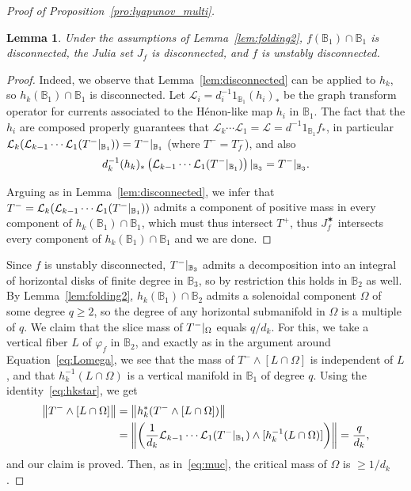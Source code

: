\documentclass[oneside, 12pt]{amsart}
\newcommand{\norm}[1]{{\left\Vert#1\right\Vert}}
\newcommand{\rest}[1]{ \arrowvert_{#1}}
\newcommand{\unsur}[1]{\frac{1}{#1}}
\newcommand{\el}{\mathcal{L}}
\newcommand{\lrpar}[1]{\left(#1\right)}
\newcommand{\inv}{^{-1}}
\newcommand{\bb}{\mathbb{B}}
\theoremstyle{plain}
\newtheorem{lem}[thm]{Lemma}
\theoremstyle{definition}
\numberwithin{equation}{section}       %
\numberwithin{equation}{section}       %
\begin{document}
\begin{proof}[Proof of Proposition~\ref{pro:lyapunov_multi}]
\begin{lem} Under the assumptions of Lemma~\ref{lem:folding2}, 
$f(\bb_1)\cap \bb_1$ is disconnected, 
the Julia set $J_f$ is disconnected, 
and $f$ is unstably disconnected. 
\end{lem}



\begin{proof}
Indeed, we observe that Lemma~\ref{lem:disconnected} can be  applied to  $h_k$, so 
$h_k(\bb_1)\cap \bb_1$ is disconnected. Let 
$\el_i = d_i\inv 1_{\bb_1}(h_i)_*$ be the graph transform operator for currents 
associated to the Hénon-like map $h_i$ in $\bb_1$. 
The fact that  the $h_i$ are composed properly guarantees that 
$\el_k\cdots \el_1  = \el =  d\inv 1_{\bb_1} f_*$, in particular 
$\el_k(\el_{k-1}\cdots \el_1 (T^-\rest{\bb_1})) = T^-\rest{\bb_1}$ (where $T^- = T^-_f$), and also 
 \begin{equation}\label{eq:hkstar}
 d_k\inv (h_k)_* \lrpar{\el_{k-1}\cdots \el_1 (T^-\rest{\bb_1})}\rest{\bb_3}  = T^-\rest{\bb_3}.
 \end{equation}

Arguing as in Lemma~\ref{lem:disconnected}, we infer that 
$T^- = \el_k(\el_{k-1}\cdots \el_1 (T^-\rest{\bb_1}))$ admits a component of positive mass in every component of $h_k(\bb_1)\cap \bb_1$, which must thus intersect $T^+$, thus  $J_f^\varstar$ intersects every component of $h_k(\bb_1)\cap \bb_1$ and we are done.
\end{proof}
 
 Since $f$ is unstably disconnected, $T^-\rest{\bb_3}$ admits  a decomposition into 
an integral of horizontal disks of finite degree in   $\bb_3$, so by restriction 
this holds in $\bb_2$ as well. 
By Lemma~\ref{lem:folding2}, 
 $h_k(\bb_1)\cap \bb_2$ admits a solenoidal component $\Omega$ of some degree $q\geq 2$, 
 so the degree of any horizontal submanifold in $\Omega$ is a multiple of $q$. 
 We claim that the slice mass of $T^-\rest{\Omega}$ equals $q/d_k$. 
 For this, we take a vertical fiber $L$ of $\varphi_f$ in $\bb_2$, and  exactly as in the argument 
 around Equation~\eqref{eq:Lomega}, we see that the mass of $T^-\wedge [L\cap \Omega]$ is independent of $L$, and that $h_k\inv(L\cap \Omega)$ is a vertical manifold in $\bb_1$ of degree $q$. Using the identity~\eqref{eq:hkstar},  
  we get
\begin{align}
\norm{T^-\wedge [L\cap\Omega]} &= \norm{h_k^*(T^-\wedge [L\cap \Omega])}\\
\notag &= \norm{\lrpar{\unsur{d_k}\el_{k-1}\cdots \el_1 (T^-\rest{\bb_1}) \wedge [h_k\inv(L\cap \Omega)]}} = \frac{q}{d_k},
\end{align}
and our claim is proved.  
Then, as in~\eqref{eq:muc}, the critical mass of $\Omega$ is $\geq 1/d_k$. 


\end{proof}
\end{document}
